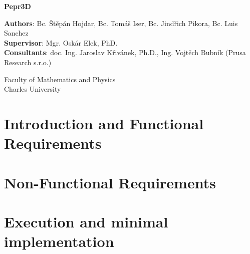 \documentclass[12pt,a4paper]{report}
\begin{document}
\begin{titlepage}
    \begin{center}
        \vspace*{1cm}
        
        \Huge
        \textbf{Pepr3D}

        \LARGE
        
        \vspace{12cm}
        
		\Large
        \textbf{Authors}: Bc. Štěpán Hojdar,
                Bc. Tomáš Iser,       
        Bc. Jindřich Pikora,
		Bc. Luis Sanchez
		\\
		\textbf{Supervisor}: Mgr. Oskár Elek, PhD.
		\\
		\textbf{Consultants}: doc. Ing. Jaroslav Křivánek, Ph.D., Ing. Vojtěch Bubník (Prusa Research s.r.o.)
        
        \vfill

		Faculty of Mathematics and Physics \\	
		Charles University		               
    \end{center}
\end{titlepage}

\setcounter{tocdepth}{1}
\tableofcontents

\part{Introduction and Functional Requirements}




\part{Non-Functional Requirements}




\part{Execution and minimal implementation}

\end{document}
